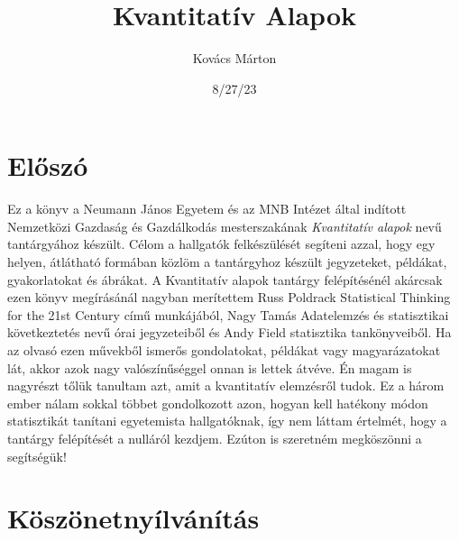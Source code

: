 \documentclass[
  letterpaper,
  DIV=11,
  numbers=noendperiod]{scrreprt}
\title{Kvantitatív Alapok}
\author{Kovács Márton}
\date{8/27/23}
\renewcommand*\contentsname{Table of contents}
\newcommand\contentsname{Table of contents}
\begin{document}
\maketitle
\ifdefined\Shaded\renewenvironment{Shaded}{\begin{tcolorbox}[borderline west={3pt}{0pt}{shadecolor}, boxrule=0pt, breakable, frame hidden, sharp corners, interior hidden, enhanced]}{\end{tcolorbox}}\fi

\renewcommand*\contentsname{Table of contents}
{
\hypersetup{linkcolor=}
\setcounter{tocdepth}{2}
\tableofcontents
}

\hypertarget{elux151szuxf3}{%
\chapter*{Előszó}\label{elux151szuxf3}}


Ez a könyv a Neumann János Egyetem és az MNB Intézet által indított
Nemzetközi Gazdaság és Gazdálkodás mesterszakának \emph{Kvantitatív
alapok} nevű tantárgyához készült. Célom a hallgatók felkészülését
segíteni azzal, hogy egy helyen, átlátható formában közlöm a tantárgyhoz
készült jegyzeteket, példákat, gyakorlatokat és ábrákat. A Kvantitatív
alapok tantárgy felépítésénél akárcsak ezen könyv megírásánál nagyban
merítettem Russ Poldrack Statistical Thinking for the 21st Century című
munkájából, Nagy Tamás Adatelemzés és statisztikai következtetés nevű
órai jegyzeteiből és Andy Field statisztika tankönyveiből. Ha az olvasó
ezen művekből ismerős gondolatokat, példákat vagy magyarázatokat lát,
akkor azok nagy valószínűséggel onnan is lettek átvéve. Én magam is
nagyrészt tőlük tanultam azt, amit a kvantitatív elemzésről tudok. Ez a
három ember nálam sokkal többet gondolkozott azon, hogyan kell hatékony
módon statisztikát tanítani egyetemista hallgatóknak, így nem láttam
értelmét, hogy a tantárgy felépítését a nulláról kezdjem. Ezúton is
szeretném megköszönni a segítségük!


\hypertarget{kuxf6szuxf6netnyuxedlvuxe1nuxedtuxe1s}{%
\chapter*{Köszönetnyílvánítás}\label{kuxf6szuxf6netnyuxedlvuxe1nuxedtuxe1s}}
\end{document}
